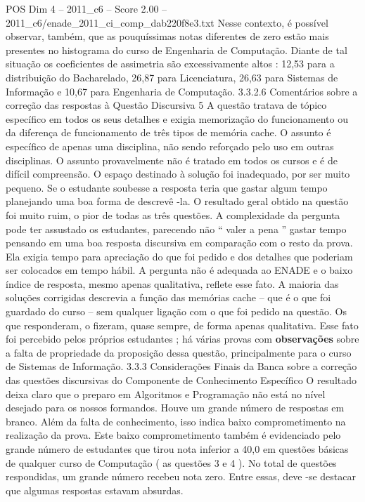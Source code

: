 \begin{textsample}{POS Dim 4 – 2011\_c6 – Score 2.00 – 2011\_c6/enade\_2011\_ci\_comp\_dab220f8e3.txt}
Nesse contexto, é possível observar, também, que as pouquíssimas notas diferentes de zero estão mais presentes no histograma do curso de Engenharia de Computação.
Diante de tal situação os coeficientes de assimetria são excessivamente altos : 12,53 para a distribuição do Bacharelado, 26,87 para Licenciatura, 26,63 para Sistemas de Informação e 10,67 para Engenharia de Computação. 3.3.2.6 Comentários sobre a correção das respostas à Questão Discursiva 5 A questão tratava de tópico específico em todos os seus detalhes e exigia memorização do funcionamento ou da diferença de funcionamento de três tipos de memória cache.
O assunto é específico de apenas uma disciplina, não sendo reforçado pelo uso em outras disciplinas.
O assunto provavelmente não é tratado em todos os cursos e é de difícil compreensão.
O espaço destinado à solução foi inadequado, por ser muito pequeno.
Se o estudante soubesse a resposta teria que gastar algum tempo planejando uma boa forma de descrevê -la.
O resultado geral obtido na questão foi muito ruim, o pior de todas as três questões.
A complexidade da pergunta pode ter assustado os estudantes, parecendo não “ valer a pena ” gastar tempo pensando em uma boa resposta discursiva em comparação com o resto da prova.
Ela exigia tempo para apreciação do que foi pedido e dos detalhes que poderiam ser colocados em tempo hábil.
A pergunta não é adequada ao ENADE e o baixo índice de resposta, mesmo apenas qualitativa, reflete esse fato.
A maioria das soluções corrigidas descrevia a função das memórias cache – que é o que foi guardado do curso – sem qualquer ligação com o que foi pedido na questão.
Os que responderam, o fizeram, quase sempre, de forma apenas qualitativa.
Esse fato foi percebido pelos próprios estudantes ; há várias provas com \textbf{observações} sobre a falta de propriedade da proposição dessa questão, principalmente para o curso de Sistemas de Informação. 3.3.3 Considerações Finais da Banca sobre a correção das questões discursivas do Componente de Conhecimento Específico O resultado deixa claro que o preparo em Algoritmos e Programação não está no nível desejado para os nossos formandos.
Houve um grande número de respostas em branco.
Além da falta de conhecimento, isso indica baixo comprometimento na realização da prova.
Este baixo comprometimento também é evidenciado pelo grande número de estudantes que tirou nota inferior a 40,0 em questões básicas de qualquer curso de Computação ( as questões 3 e 4 ).
No total de questões respondidas, um grande número recebeu nota zero.
Entre essas, deve -se destacar que algumas respostas estavam absurdas.

\end{textsample}

